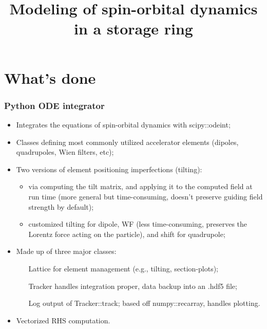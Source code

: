 \documentclass[pdf]{beamer}
\title{Modeling of spin-orbital dynamics in a storage ring}
\begin{document}
	\begin{frame}
		\titlepage
	\end{frame}		
\section{What's done}
	\begin{frame}
		\frametitle{Python ODE integrator}
		\begin{itemize}
			\item Integrates the equations of spin-orbital dynamics with scipy::odeint;
			\item Classes defining most commonly utilized accelerator elements (dipoles, quadrupoles, Wien filters, etc);
			\item Two versions of element positioning imperfections (tilting):
			\begin{itemize}
				\item via computing the tilt matrix, and applying it to the computed field at run time (more general but time-consuming, doesn't preserve guiding field strength by default);
				\item customized tilting for dipole, WF (less time-consuming, preserves the Lorentz force acting on the particle), and shift for quadrupole;
			\end{itemize}
			\item Made up of three major classes:
			\begin{itemize}
				\item[Lattice] for element management (e.g., tilting, section-plots);
				\item[Tracker] handles integration proper, data backup into an .hdf5 file;
				\item[Log] output of Tracker::track; based off numpy::recarray, handles plotting.
			\end{itemize}
		\item Vectorized RHS computation.
		\end{itemize}
	\end{frame}
\end{document}
